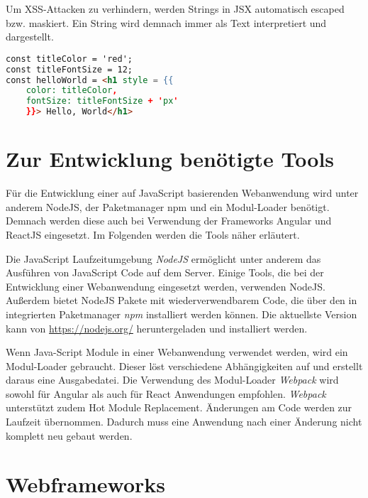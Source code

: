 Um XSS-Attacken zu verhindern, werden Strings in JSX automatisch escaped bzw. maskiert. Ein String wird demnach immer als Text interpretiert und dargestellt.\autocites[vgl.][59\psqq]{Zeigermann.2016}[vgl.][65\psqq]{Stefanov.2017} 

\begin{lstlisting}[caption=Beispiel für die Verwendung von JSX, label=lst:JSXBeispiel, language=HTML]
const titleColor = 'red';
const titleFontSize = 12;
const helloWorld = <h1 style = {{
	color: titleColor,
	fontSize: titleFontSize + 'px'
	}}> Hello, World</h1>
\end{lstlisting}



\section{Zur Entwicklung benötigte Tools}
Für die Entwicklung einer auf JavaScript basierenden Webanwendung wird unter anderem NodeJS, der Paketmanager npm und ein Modul-Loader benötigt. Demnach werden diese auch bei Verwendung der Frameworks Angular und ReactJS eingesetzt. Im Folgenden werden die Tools näher erläutert.

\label{NodeJS}
Die JavaScript Laufzeitumgebung \textit{NodeJS} ermöglicht unter anderem das Ausführen von JavaScript Code auf dem Server. Einige Tools, die bei der Entwicklung einer Webanwendung eingesetzt werden, verwenden NodeJS. Außerdem bietet NodeJS Pakete mit wiederverwendbarem Code, die über den in integrierten Paketmanager \textit{npm} installiert werden können. Die aktuellste Version kann von \url{https://nodejs.org/} heruntergeladen und installiert werden.  \autocites[vgl.][1\psqq]{Steyer.2017}[vgl.][7\psqq]{Freeman.2018}[vgl.][6\psqq]{Woiwode.2018} 

\label{Webpack}
Wenn Java-Script Module in einer Webanwendung verwendet werden, wird ein Modul-Loader gebraucht. Dieser löst verschiedene Abhängigkeiten auf und erstellt daraus eine Ausgabedatei. Die Verwendung des Modul-Loader \textit{Webpack} wird sowohl für Angular als auch für React Anwendungen empfohlen. \textit{Webpack} unterstützt zudem Hot Module Replacement. Änderungen am Code werden zur Laufzeit übernommen. Dadurch muss eine Anwendung nach einer Änderung nicht komplett neu gebaut werden.\autocites[vgl.][13,21]{Woiwode.2018}[vgl.][9,295-301]{Zeigermann.2016}[vgl.][]{Hlushko.2018}


\section{Webframeworks}

